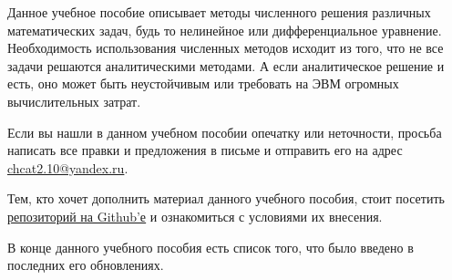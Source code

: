 \documentclass[17pt, a4paper]{extarticle}
\begin{document}

	Данное учебное пособие описывает методы численного решения различных
	математических задач, будь то нелинейное или дифференциальное уравнение.
	Необходимость использования численных методов исходит из того, что не
	все задачи решаются аналитическими методами. А если аналитическое
	решение и есть, оно может быть неустойчивым или требовать на ЭВМ
	огромных вычислительных затрат.

	Если вы нашли в данном учебном пособии опечатку или неточности, просьба
	написать все правки и предложения в письме и отправить его на адрес
	\href{mailto:chcat2.10@yandex.ru}{chcat2.10@yandex.ru}.

	Тем, кто хочет дополнить материал данного учебного пособия, стоит
	посетить \href{https://github.com/mu2so4/Computational-Mathematics-Book}
	{\underline{репозиторий на Github'е}} и ознакомиться с условиями их
	внесения.

	В конце данного учебного пособия есть список того, что было введено в
	последних его обновлениях.
	\newline\newline
\end{document}

